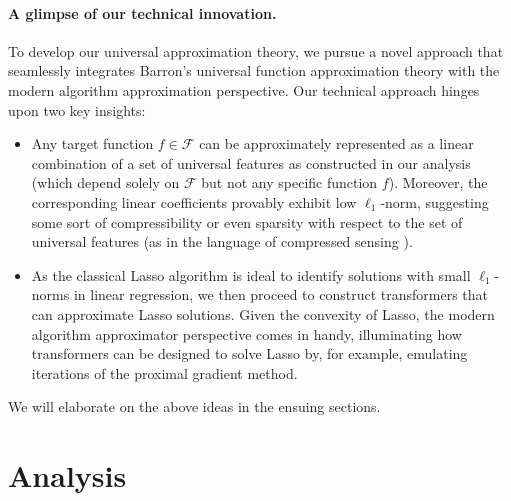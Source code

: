 \documentclass[english]{article}
\begin{document}
\paragraph{A glimpse of our technical innovation.} 
		To develop our universal approximation theory, we pursue a novel approach that  
		seamlessly integrates Barron's universal function approximation theory with the modern algorithm approximation perspective. Our technical approach hinges upon two key insights: 
		\begin{itemize}

			\item[(i)] Any target function $f \in \mathcal{F}$ can be approximately represented as a linear combination of a set of universal features as constructed in our analysis (which depend solely on $\mathcal{F}$ but not any specific function $f$). Moreover, the corresponding linear coefficients provably exhibit low $\ell_1$-norm, suggesting some sort of compressibility or even sparsity with respect to the set of universal features (as in the language of compressed sensing \citep{candes2006near}). 

				
		\item[(ii)] As the classical Lasso algorithm \citep{tibshirani1996regression} is ideal to identify solutions with small $\ell_1$-norms in linear regression, we then proceed to construct transformers that can approximate Lasso solutions. 
        Given the convexity of Lasso, the modern algorithm approximator perspective comes in handy, illuminating how transformers can be designed to solve Lasso by, for example, emulating iterations of the proximal gradient method. 

		\end{itemize}
%
We will elaborate on the above ideas in the ensuing sections. 

     




\section{Analysis}
\label{sec:analysis}
\end{document}
